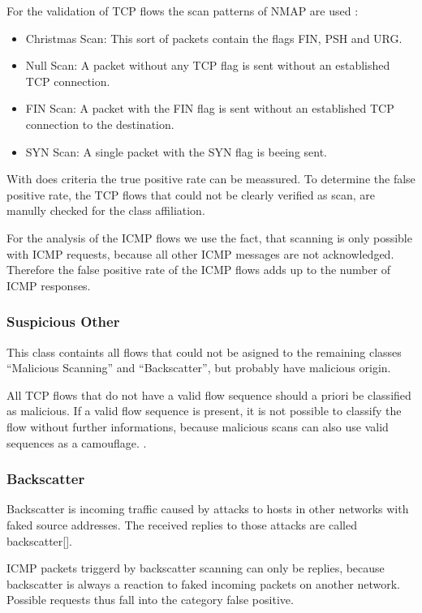 \documentclass[a4paper]{scrartcl}
\begin{document}
For  the validation of TCP flows the scan patterns of NMAP are used \cite{nmap09}:
\begin{itemize}
	\item Christmas Scan:  This sort of packets contain the flags FIN, PSH and URG.
	\item Null Scan: A packet without any TCP flag is sent without an established TCP connection. 
	\item FIN Scan: A packet with the FIN flag is sent without an established TCP connection to the destination.
	\item SYN Scan: A single packet with the SYN flag is beeing sent.
\end{itemize}
With does criteria the true positive rate can be meassured. 
To determine the false positive rate, the TCP flows that could not be clearly verified as scan, are manully checked for the class affiliation.

For the analysis of the ICMP flows we use the fact, that scanning is only possible with ICMP requests, because all other ICMP messages are not acknowledged\cite{rfc_icmp}. Therefore the false positive rate of the ICMP flows adds up to the number of ICMP responses.

\subsubsection{Suspicious Other}
This class containts all flows that could not be asigned to the remaining classes ``Malicious Scanning'' and ``Backscatter'', but probably have malicious origin.

All TCP flows that do not have a valid flow sequence should a priori be classified as malicious. If a valid flow sequence is present, it is not possible to classify the flow without further informations, because malicious scans can also use valid sequences as a camouflage. \cite{nmap09}.

\subsubsection{Backscatter}
Backscatter is incoming traffic caused by attacks to hosts in other networks with faked source addresses. The received replies to those attacks are called backscatter[]. 

ICMP packets triggerd by backscatter scanning can only be replies, because backscatter is always a reaction to faked incoming packets on another network. Possible requests thus fall into the category false positive.
\end{document}
